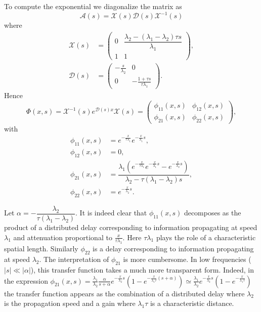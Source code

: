 \documentclass[preprint]{elsarticle}
\begin{document}
To compute the exponential we diagonalize the matrix as 
\begin{equation}
\mathscr{A}(s) = \mathscr{X}(s)\mathscr{D}(s)\mathscr{X}^{-1}(s)
\end{equation} 
where  
\begin{align}
\mathscr{X}(s) &= \begin{pmatrix}
0 & \dfrac{\lambda_2 - (\lambda_1 - \lambda_2) \tau s}{\lambda_1} \\
1 & 1
\end{pmatrix}, \\
\mathscr{D}(s) &= \begin{pmatrix}
-\frac{s}{\lambda_2} & 0 \\
 0 & -\frac{1+\tau s}{\tau \lambda_1}
\end{pmatrix}.
\end{align}
Hence
\begin{equation}
\Phi(x,s) =  \mathscr{X}^{-1}(s)e^{\mathscr{D}(s)x}\mathscr{X}(s) =
\begin{pmatrix}
\phi_{11}(x,s) & \phi_{12}(x,s) \\ 
\phi_{21}(x,s) & \phi_{22}(x,s)
\end{pmatrix},
\end{equation}
with
\begin{subequations} \label{TFv0q0tovxqx}
\begin{align}
\phi_{11}(x,s) &= e^{-\frac{x}{\tau \lambda_1}}e^{-\frac{x}{\lambda_1}s}, \\ 
\phi_{12}(x,s) &= 0, \\
\phi_{21}(x,s) &= \dfrac{\lambda_1 \left( e^{-\frac{x}{\tau \lambda_1}}e^{-\frac{x}{\lambda_1}s} - e^{-\frac{x}{\lambda_2}s}\right)}{\lambda_2 - \tau (\lambda_1 - \lambda_2)s}, \\
\phi_{22}(x,s) &= e^{-\frac{x}{\lambda_2}s}.
\end{align}
\end{subequations}


Let $\alpha = -\dfrac{\lambda_2}{\tau(\lambda_1 - \lambda_2)}$. It is indeed clear that $\phi_{11}\left(x,s\right)$ decomposes as the product of a distributed delay corresponding to information propagating at speed $\lambda_{1}$ and attenuation proportional to $\frac{x}{\tau\lambda_{1}}$. Here $\tau\lambda_{1}$ plays the role of a characteristic spatial length. Similarly $\phi_{22}$ is a delay corresponding to information propagating at speed $\lambda_{2}$. The interpretation of $\phi_{21}$ is more cumbersome. In low frequencies ($\left|s\right|\ll\left|\alpha\right|$), this transfer function takes a much more transparent form. Indeed, in the expression
$
\phi_{21}(x,s) = 
\frac{\lambda_{1}}{\lambda_{2}}\frac{\alpha}
{s + \alpha}
e^{-\frac{x}{\lambda_2}s}
	\left(
		1 - e^{-\frac{x}{\lambda_1 \tau}\left(s + \alpha\right)}
	\right)
\simeq \frac{\lambda_{1}}{\lambda_{2}} e^{-\frac{x}{\lambda_2}s}
	\left(
		1 - e^{-\frac{x}{\lambda_1 \tau}}
	\right)
$
the transfer function appears as the combination of a distributed delay where $\lambda_{2}$ is the propagation speed and a gain where $\lambda_{1}\tau$ is a characteristic distance.
\end{document}
